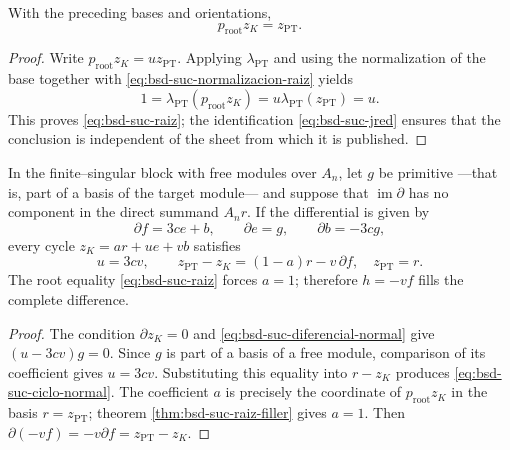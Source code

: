 \begin{theorem}
\label{thm:bsd-suc-raiz-filler}
With the preceding bases and orientations,
\begin{equation}\label{eq:bsd-suc-raiz}
 p_{\mathrm{root}}z_K=z_{\mathrm{PT}}.
\end{equation}
\end{theorem}

\begin{proof}
Write
\(p_{\mathrm{root}}z_K=u z_{\mathrm{PT}}\). Applying
\(\lambda_{\mathrm{PT}}\) and using the normalization of the base together with
\eqref{eq:bsd-suc-normalizacion-raiz} yields
\[
 1=\lambda_{\mathrm{PT}}(p_{\mathrm{root}}z_K)
  =u\lambda_{\mathrm{PT}}(z_{\mathrm{PT}})=u.
\]
This proves \eqref{eq:bsd-suc-raiz}; the identification
\eqref{eq:bsd-suc-jred} ensures that the conclusion is independent of the
sheet from which it is published.
\end{proof}

\begin{lemma}
\label{lem:bsd-suc-forma-normal}
In the finite--singular block with
free modules over \(A_n\), let \(g\) be primitive ---that is, part of a
basis of the target module--- and suppose that
\(\operatorname{im}\partial\) has no component in the direct summand
\(A_n r\). If the differential is given by
\begin{equation}\label{eq:bsd-suc-diferencial-normal}
 \partial f=3c e+b,
 \qquad \partial e=g,
 \qquad \partial b=-3c g,
\end{equation}
every cycle \(z_K=a r+u e+v b\) satisfies
\begin{equation}\label{eq:bsd-suc-ciclo-normal}
 u=3cv,
 \qquad
 z_{\mathrm{PT}}-z_K=(1-a)r-v\,\partial f,
 \quad z_{\mathrm{PT}}=r.
\end{equation}
The root equality \eqref{eq:bsd-suc-raiz} forces \(a=1\); therefore
\(h=-vf\) fills the complete difference.
\end{lemma}

\begin{proof}
The condition \(\partial z_K=0\) and
\eqref{eq:bsd-suc-diferencial-normal} give
\((u-3cv)g=0\). Since \(g\) is part of a basis of a free module,
comparison of its coefficient gives \(u=3cv\). Substituting this equality into
\(r-z_K\) produces \eqref{eq:bsd-suc-ciclo-normal}. The coefficient \(a\)
is precisely the coordinate of \(p_{\mathrm{root}}z_K\) in the basis
\(r=z_{\mathrm{PT}}\); theorem \ref{thm:bsd-suc-raiz-filler} gives
\(a=1\). Then
\(\partial(-vf)=-v\partial f=z_{\mathrm{PT}}-z_K\).
\end{proof}

